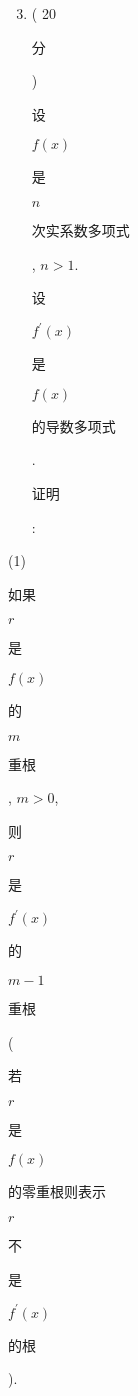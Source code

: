 \documentclass[10pt]{article}
\begin{document}
\begin{enumerate}
  \setcounter{enumi}{2}
  \item ( 20 \begin{CJK}{UTF8}{mj}分\end{CJK}) \begin{CJK}{UTF8}{mj}设\end{CJK} $f(x)$ \begin{CJK}{UTF8}{mj}是\end{CJK} $n$ \begin{CJK}{UTF8}{mj}次实系数多项式\end{CJK}, $n>1$. \begin{CJK}{UTF8}{mj}设\end{CJK} $f^{\prime}(x)$ \begin{CJK}{UTF8}{mj}是\end{CJK} $f(x)$ \begin{CJK}{UTF8}{mj}的导数多项式\end{CJK}. \begin{CJK}{UTF8}{mj}证明\end{CJK}:
\end{enumerate}
(1) \begin{CJK}{UTF8}{mj}如果\end{CJK} $r$ \begin{CJK}{UTF8}{mj}是\end{CJK} $f(x)$ \begin{CJK}{UTF8}{mj}的\end{CJK} $m$ \begin{CJK}{UTF8}{mj}重根\end{CJK}, $m>0$, \begin{CJK}{UTF8}{mj}则\end{CJK} $r$ \begin{CJK}{UTF8}{mj}是\end{CJK} $f^{\prime}(x)$ \begin{CJK}{UTF8}{mj}的\end{CJK} $m-1$ \begin{CJK}{UTF8}{mj}重根\end{CJK} (\begin{CJK}{UTF8}{mj}若\end{CJK} $r$ \begin{CJK}{UTF8}{mj}是\end{CJK} $f(x)$ \begin{CJK}{UTF8}{mj}的零重根则表示\end{CJK} $r$ \begin{CJK}{UTF8}{mj}不\end{CJK} \begin{CJK}{UTF8}{mj}是\end{CJK} $f^{\prime}(x)$ \begin{CJK}{UTF8}{mj}的根\end{CJK}).
\end{document}
